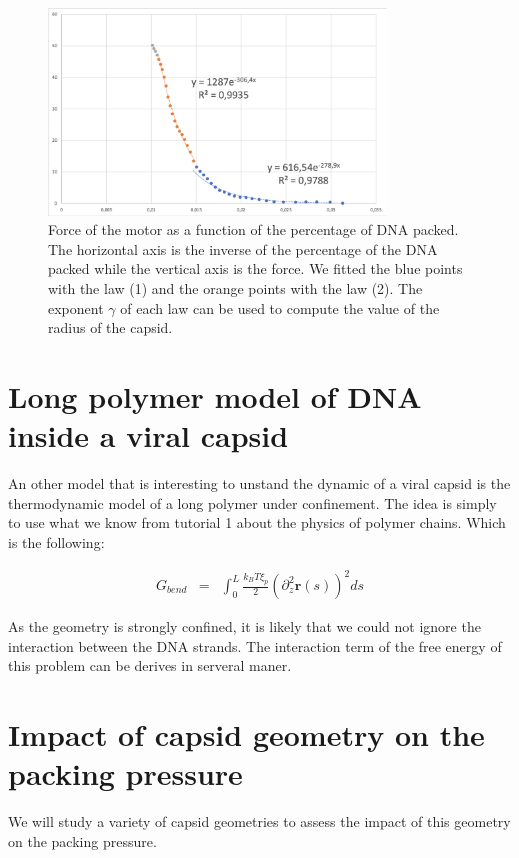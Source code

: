 \documentclass{article}
\begin{document}
\begin{figure}[H]
    \centering
    \includegraphics[width=0.8\textwidth]{Fig_Exponents.png}
    \caption{Force of the motor as a function of the percentage of DNA packed. The horizontal axis is the inverse of the percentage of the DNA packed while the vertical axis is the force. We fitted the blue points with the law (1) and the orange points with the law (2). The exponent $\gamma$ of each law can be used to compute the value of the radius of the capsid.}
    \label{fig:force}
\end{figure}

\section{Long polymer model of DNA inside a viral capsid}
An other model that is interesting to unstand the dynamic of a viral capsid is the thermodynamic model of a long polymer under confinement. The idea is simply to use what we know from tutorial 1 about the physics of polymer chains. Which is the following:

\begin{eqnarray}
    G_{bend} & = & \int_{0}^{L} \frac{k_B T \xi_p}{2} \left( \partial_z^2 \mathbf{r}(s) \right)^2 ds
\end{eqnarray}

As the geometry is strongly confined, it is likely that we could not ignore the interaction between the DNA strands. The interaction term of the free energy of this problem can be derives in serveral maner.

\section{Impact of capsid geometry on the packing pressure}

We will study a variety of capsid geometries to assess the impact of this geometry on the packing pressure.
\end{document}
